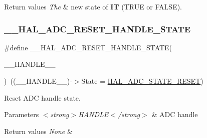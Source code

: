 \begin{DoxyRetVals}{Return values}
{\em The} & new state of {\bfseries{IT}} (T\+R\+UE or F\+A\+L\+SE). \\
\hline
\end{DoxyRetVals}
\mbox{\label{group___a_d_c___exported___macros_gacb290bae25b972942021331122a3600f}} 
\subsubsection{\texorpdfstring{\_\_HAL\_ADC\_RESET\_HANDLE\_STATE}{\_\_HAL\_ADC\_RESET\_HANDLE\_STATE}}
{\footnotesize\ttfamily \#define \+\_\+\+\_\+\+H\+A\+L\+\_\+\+A\+D\+C\+\_\+\+R\+E\+S\+E\+T\+\_\+\+H\+A\+N\+D\+L\+E\+\_\+\+S\+T\+A\+TE(\begin{DoxyParamCaption}\item[{}]{\+\_\+\+\_\+\+H\+A\+N\+D\+L\+E\+\_\+\+\_\+ }\end{DoxyParamCaption})~((\+\_\+\+\_\+\+H\+A\+N\+D\+L\+E\+\_\+\+\_\+)-\/$>$State = \mbox{\hyperlink{group___a_d_c___exported___types_ga3f995b6dedd7366d0663f852511b9104}{H\+A\+L\+\_\+\+A\+D\+C\+\_\+\+S\+T\+A\+T\+E\+\_\+\+R\+E\+S\+ET}})}



Reset A\+DC handle state. 


\begin{DoxyParams}{Parameters}
{\em $<$strong$>$\+H\+A\+N\+D\+L\+E$<$/strong$>$} & A\+DC handle \\
\hline
\end{DoxyParams}

\begin{DoxyRetVals}{Return values}
{\em None} & \\
\hline
\end{DoxyRetVals}
